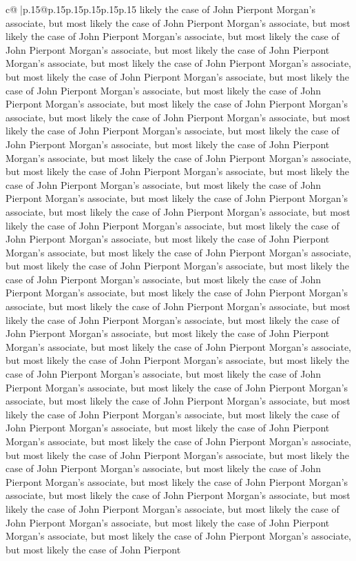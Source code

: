 \documentclass{article}
\begin{document}
{\begin{supertabular}{c@{$\;$}|p{.15\linewidth}@{}p{.15\linewidth}p{.15\linewidth}p{.15\linewidth}p{.15\linewidth}p{.15\linewidth}}
{{{likely the case of John Pierpont Morgan's associate, but most likely the case of John Pierpont Morgan's associate, but most likely the case of John Pierpont Morgan's associate, but most likely the case of John Pierpont Morgan's associate, but most likely the case of John Pierpont Morgan's associate, but most likely the case of John Pierpont Morgan's associate, but most likely the case of John Pierpont Morgan's associate, but most likely the case of John Pierpont Morgan's associate, but most likely the case of John Pierpont Morgan's associate, but most likely the case of John Pierpont Morgan's associate, but most likely the case of John Pierpont Morgan's associate, but most likely the case of John Pierpont Morgan's associate, but most likely the case of John Pierpont Morgan's associate, but most likely the case of John Pierpont Morgan's associate, but most likely the case of John Pierpont Morgan's associate, but most likely the case of John Pierpont Morgan's associate, but most likely the case of John Pierpont Morgan's associate, but most likely the case of John Pierpont Morgan's associate, but most likely the case of John Pierpont Morgan's associate, but most likely the case of John Pierpont Morgan's associate, but most likely the case of John Pierpont Morgan's associate, but most likely the case of John Pierpont Morgan's associate, but most likely the case of John Pierpont Morgan's associate, but most likely the case of John Pierpont Morgan's associate, but most likely the case of John Pierpont Morgan's associate, but most likely the case of John Pierpont Morgan's associate, but most likely the case of John Pierpont Morgan's associate, but most likely the case of John Pierpont Morgan's associate, but most likely the case of John Pierpont Morgan's associate, but most likely the case of John Pierpont Morgan's associate, but most likely the case of John Pierpont Morgan's associate, but most likely the case of John Pierpont Morgan's associate, but most likely the case of John Pierpont Morgan's associate, but most likely the case of John Pierpont Morgan's associate, but most likely the case of John Pierpont Morgan's associate, but most likely the case of John Pierpont Morgan's associate, but most likely the case of John Pierpont Morgan's associate, but most likely the case of John Pierpont Morgan's associate, but most likely the case of John Pierpont Morgan's associate, but most likely the case of John Pierpont Morgan's associate, but most likely the case of John Pierpont Morgan's associate, but most likely the case of John Pierpont Morgan's associate, but most likely the case of John Pierpont Morgan's associate, but most likely the case of John Pierpont Morgan's associate, but most likely the case of John Pierpont Morgan's associate, but most likely the case of John Pierpont Morgan's associate, but most likely the case of John Pierpont Morgan's associate, but most likely the case of John Pierpont Morgan's associate, but most likely the case of John Pierpont Morgan's associate, but most likely the case of John Pierpont Morgan's associate, but most likely the case of John Pierpont Morgan's associate, but most likely the case of John Pierpont }}}
\end{supertabular}}
\end{document}
